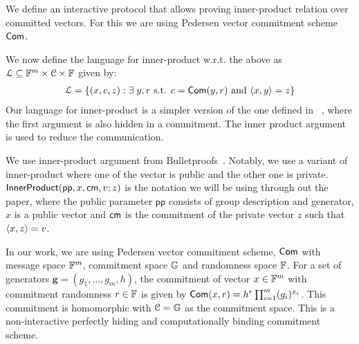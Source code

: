 We define an interactive protocol that allows proving inner-product relation over committed vectors. For this we are using Pedersen vector commitment scheme $\mathsf{Com}$.

We now define the language for inner-product w.r.t. the above  as $\mathcal{L} \subseteq \mathbb{F}^m \times \mathcal{C} \times \mathbb{F}$ given by:
\begin{equation*}
\begin{array}{l}
\mathcal{L} = \{(x,c,z):\exists \; y,r \text{ s.t. } 
c=\mathsf{Com}(y,r)  \text{ and } \langle x,y\rangle=z\} 
\end{array}
\end{equation*}
Our language for inner-product is a simpler version of the one defined in ~\cite{bulletproofs}, where the first argument is also hidden in a commitment. The inner product argument is used to reduce the communication.

We use inner-product argument from Bulletproofs~\cite{bulletproofs}. Notably, we use a variant of inner-product where one of the vector is public and the other one is private. $\mathsf{InnerProduct}(\mathsf{pp}, x, \mathsf{cm}, v ; z)$ is the notation we will be using through out the paper, where the public parameter $\mathsf{pp}$  consists of group description and generator, $x$ is a public vector and $\mathsf{cm}$ is the commitment of the private vector $z$ such that $\langle x,z\rangle = v$.




In our work, we are using Pedersen vector commitment scheme, $\mathsf{Com}$ with message space $\mathbb{F}^m$, commitment space $\mathbb{G}$ and randomness space $\mathbb{F}$. For a set of generators $\bm{g}=(g_1,\ldots,g_m,h)$, the commitment of vector $x\in \mathbb{F}^m$ with commitment randomness $r\in \mathbb{F}$ is given by $\mathsf{Com}(x,r)=h^r \prod_{i=1}^m (g_i)^{x_i} $. This commitment is homomorphic with $\mathcal{C}=\mathbb{G}$ as the commitment space. This is a non-interactive perfectly hiding and computationally binding commitment scheme.

